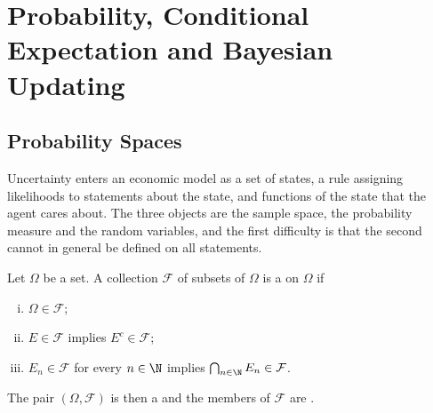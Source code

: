 
\chapter[Probability and Conditional Expectation]{Probability, Conditional Expectation and Bayesian Updating}
\label{ch:probability}

\section{Probability Spaces}\label{sec:prob-spaces}

Uncertainty enters an economic model as a set of states, a rule assigning
likelihoods to statements about the state, and functions of the state that the
agent cares about. The three objects are the sample space, the probability
measure and the random variables, and the first difficulty is that the second
cannot in general be defined on all statements.

\begin{definition}\label{def:sigma-algebra}
	Let $\Omega$ be a set. A collection $\mathcal{F}$ of subsets of $\Omega$ is a
	 on $\Omega$ if
	\begin{enumerate}[(i)]
		\item $\Omega\in\mathcal{F}$;
		\item $E\in\mathcal{F}$ implies $E^{c}\in\mathcal{F}$;
		\item $E_n\in\mathcal{F}$ for every $n\in\N$ implies $\bigcap_{n\in\N}E_n\in\mathcal{F}$.
	\end{enumerate}
	The pair $(\Omega,\mathcal{F})$ is then a  and
	the members of $\mathcal{F}$ are .
\end{definition}

